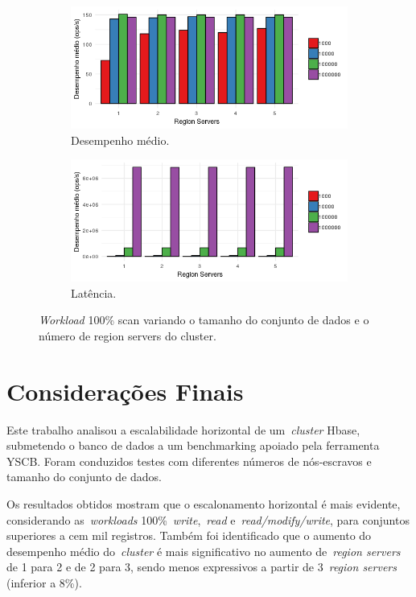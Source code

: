 \documentclass[12pt]{article}
\begin{document}
\begin{figure}
    \centering
    \begin{subfigure}[b]{0.49\textwidth}   
        \centering 
        \includegraphics[width=\textwidth]{images/figura21}
        \caption{Desempenho médio.}
        \label{figura21}
    \end{subfigure}
    \begin{subfigure}[b]{0.49\textwidth}   
        \centering 
        \includegraphics[width=\textwidth]{images/figura22}
        \caption{Latência.}
        \label{figura22}
    \end{subfigure}
    \caption{\emph{Workload} 100\% scan variando o tamanho do conjunto de dados e o número de region servers do cluster.}
\end{figure}

\section{Considerações Finais}
\label{sec:finais}

Este trabalho analisou a escalabilidade horizontal de um~\emph{cluster}  Hbase, submetendo o banco de dados a um benchmarking apoiado pela ferramenta YSCB. 
Foram conduzidos testes com diferentes números de nós-escravos e tamanho do conjunto de dados.

Os resultados obtidos mostram que o escalonamento horizontal é mais evidente, considerando as~\emph{workloads} 100\%~\emph{write},~\emph{read} e~\emph{read/modify/write}, para conjuntos superiores a cem mil registros. 
Também foi identificado que o aumento do desempenho médio do~\emph{cluster}  é mais significativo no aumento de~\emph{region servers} de 1 para 2 e de 2 para 3, sendo menos expressivos a partir de 3~\emph{region servers} (inferior a 8\%).
\end{document}
